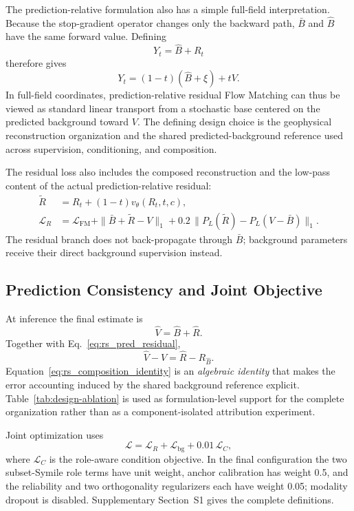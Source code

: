 The prediction-relative formulation also has a simple full-field interpretation. Because the stop-gradient operator changes only the backward path, $\bar B$ and $\hat B$ have the same forward value. Defining
\begin{equation}
Y_t=\hat B+R_t
\end{equation}
therefore gives
\begin{equation}
Y_t=(1-t)(\hat B+\xi)+tV.
\label{eq:background-centered-path}
\end{equation}
In full-field coordinates, prediction-relative residual Flow Matching can thus be viewed as standard linear transport from a stochastic base centered on the predicted background toward $V$. The defining design choice is the geophysical reconstruction organization and the shared predicted-background reference used across supervision, conditioning, and composition.

The residual loss also includes the composed reconstruction and the low-pass content of the actual prediction-relative residual:
\begin{align}
\widetilde R
&=R_t+(1-t)v_\theta(R_t,t,c),\\
\mathcal L_R
&=
\mathcal L_{\mathrm{FM}}
+\|\bar B+\widetilde R-V\|_1
+0.2\,\|P_L(\widetilde R)-P_L(V-\bar B)\|_1.
\label{eq:residual-loss-final}
\end{align}
The residual branch does not back-propagate through $\bar B$; background parameters receive their direct background supervision instead.

\subsection{Prediction Consistency and Joint Objective}

At inference the final estimate is
\begin{equation}
\hat V=\hat B+\hat R.
\end{equation}
Together with Eq.~\eqref{eq:rs_pred_residual},
\begin{equation}
\hat V-V=\hat R-R_{\hat B}.
\label{eq:rs_composition_identity}
\end{equation}
Equation~\eqref{eq:rs_composition_identity} is an \emph{algebraic identity} that makes the error accounting induced by the shared background reference explicit. Table~\ref{tab:design-ablation} is used as formulation-level support for the complete organization rather than as a component-isolated attribution experiment.

Joint optimization uses
\begin{equation}
\mathcal L=\mathcal L_R+\mathcal L_{\mathrm{bg}}+0.01\,\mathcal L_C ,
\end{equation}
where $\mathcal L_C$ is the role-aware condition objective. In the final configuration the two subset-Symile role terms have unit weight, anchor calibration has weight 0.5, and the reliability and two orthogonality regularizers each have weight 0.05; modality dropout is disabled. Supplementary Section~S1 gives the complete definitions.

